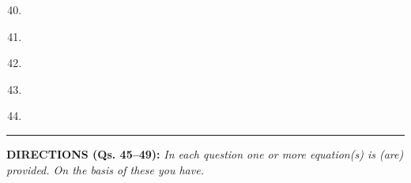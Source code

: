 \begin{multicols}{2}
\begin{enumerate}[leftmargin=*]
\setcounter{enumi}{39}
\item 
\begin{itemize}
\end{itemize}

\item 
\begin{itemize}
\end{itemize}

\item 
\begin{itemize}
\end{itemize}

\item 
\begin{itemize}
\end{itemize}

\item 
\begin{itemize}
\end{itemize}
\end{enumerate}

\noindent
\rule{\columnwidth}{1pt}

\noindent
{\sf\bfseries DIRECTIONS (Qs. 45--49):} {\it In each question one or more equation(s) is (are) provided. On the basis of these you have.}


\end{multicols}
